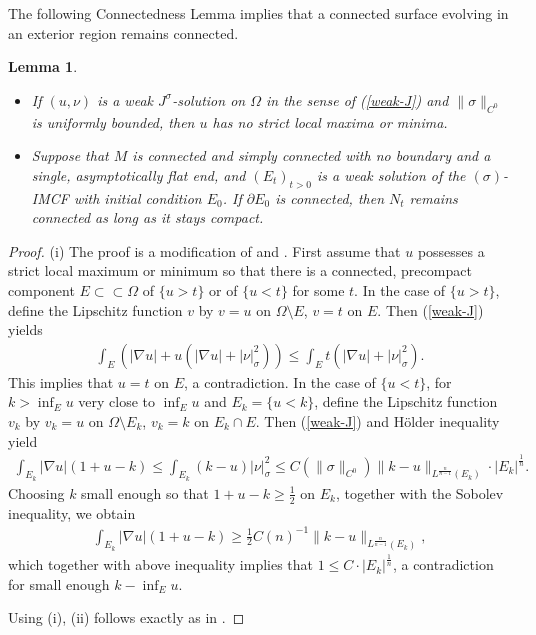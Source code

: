\documentclass[11pt, letterpaper]{amsart}
\newtheorem{lem}[thm]{Lemma}
\theoremstyle{definition}
\theoremstyle{remark}
\begin{document}
The following Connectedness Lemma implies that a connected surface evolving in an exterior region remains connected.
\begin{lem}\label{lem-connected}
\ 
	\begin{itemize}
		\item [(i)] If $(u, \nu )$ is a weak $J^{\sigma }$-solution on $\Omega $ in the sense of (\ref{weak-J}) and $\|\sigma \|_{C^0}$ is uniformly bounded, then $u$ has no strict local maxima or minima.
		\item [(ii)] Suppose that $M$ is connected and simply connected with no boundary and a single, asymptotically flat end, and $(E_t)_{t>0}$ is a weak solution of the $(\sigma )$-IMCF with initial condition $E_0$. If $\partial E_0$ is connected, then $N_t$ remains connected as long as it stays compact.
	\end{itemize}
\end{lem}
\begin{proof}
	(i) The proof is a modification of \cite[Lemma 4.2]{HI01} and \cite[Lemma 21]{Moore12}.
	First assume that $u$ possesses a strict local maximum or minimum so that there is a connected, precompact component $E \subset \subset \Omega  $ of $\{u>t\} $ or of $\{u<t\} $ for some $t$. In the case of $\{u>t\} $, define the Lipschitz function $v$ by $v=u$ on $\Omega \setminus E$, $v= t$ on $E$. Then (\ref{weak-J}) yields
	\begin{align*}
		\int_{E} \left( |\nabla u| + u\left( |\nabla u| + |\nu |^2_{\sigma } \right)  \right) \leq \int_{E} t \left( |\nabla u| +|\nu |^2_{\sigma } \right).
	\end{align*} 
	This implies that $u=t$ on $E$, a contradiction. In the case of $\{u<t\} $, for $k> \inf_{E} u $ very close to $\inf_{E} u$ and $E_k = \{u< k\} $, define the Lipschitz function $v_k$ by $v_k = u$ on $\Omega \setminus E_k$, $v_k = k$ on $E_k \cap E$. Then (\ref{weak-J}) and H\"older inequality yield
	\begin{align*}
		\int_{E_k} |\nabla u| \left( 1 + u - k \right) \leq \int_{E_k} (k-u) |\nu |^2_{\sigma } \leq C(\|\sigma \|_{C^0}) \|k-u\|_{L^{\frac{n}{n-1}}(E_k)}\cdot |E_k| ^{\frac{1}{n}}.
	\end{align*} 
	Choosing $k$ small enough so that $1+ u- k \geq \frac{1}{2}$ on $E_k$, together with the Sobolev inequality, we obtain 
	\begin{align*}
		\int_{E_k} |\nabla u| \left( 1 + u - k \right) \geq \frac{1}{2} C(n) ^{-1} \| k-u\|_{L^{\frac{n}{n-1}}(E_k)},
	\end{align*} 
	which together with above inequality implies that $1 \leq C \cdot |E_k| ^{\frac{1}{n}}$, a contradiction for small enough $k- \inf_{E} u$.

	Using (i), (ii) follows exactly as in \cite[Lemma 4.2]{HI01}.
\end{proof}
\end{document}
